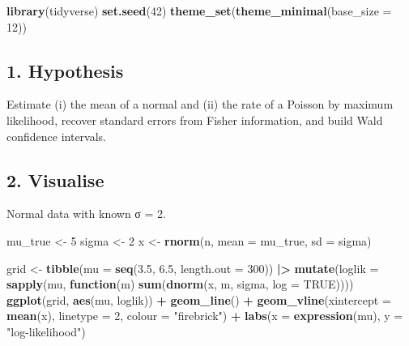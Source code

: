 \documentclass[
]{article}
\newenvironment{Shaded}{\begin{snugshade}}{\end{snugshade}}
\newcommand{\AttributeTok}[1]{\textcolor[rgb]{0.13,0.29,0.53}{#1}}
\newcommand{\ConstantTok}[1]{\textcolor[rgb]{0.56,0.35,0.01}{#1}}
\newcommand{\ControlFlowTok}[1]{\textcolor[rgb]{0.13,0.29,0.53}{\textbf{#1}}}
\newcommand{\DecValTok}[1]{\textcolor[rgb]{0.00,0.00,0.81}{#1}}
\newcommand{\FloatTok}[1]{\textcolor[rgb]{0.00,0.00,0.81}{#1}}
\newcommand{\FunctionTok}[1]{\textcolor[rgb]{0.13,0.29,0.53}{\textbf{#1}}}
\newcommand{\NormalTok}[1]{#1}
\newcommand{\OtherTok}[1]{\textcolor[rgb]{0.56,0.35,0.01}{#1}}
\newcommand{\SpecialCharTok}[1]{\textcolor[rgb]{0.81,0.36,0.00}{\textbf{#1}}}
\newcommand{\StringTok}[1]{\textcolor[rgb]{0.31,0.60,0.02}{#1}}
\begin{document}
\begin{Shaded}
\begin{Highlighting}[]
\FunctionTok{library}\NormalTok{(tidyverse)}
\FunctionTok{set.seed}\NormalTok{(}\DecValTok{42}\NormalTok{)}
\FunctionTok{theme\_set}\NormalTok{(}\FunctionTok{theme\_minimal}\NormalTok{(}\AttributeTok{base\_size =} \DecValTok{12}\NormalTok{))}
\end{Highlighting}
\end{Shaded}

\subsection{1. Hypothesis}\label{hypothesis}

Estimate (i) the mean of a normal and (ii) the rate of a Poisson by
maximum likelihood, recover standard errors from Fisher information, and
build Wald confidence intervals.

\subsection{2. Visualise}\label{visualise}

Normal data with known σ = 2.

\begin{Shaded}
\begin{Highlighting}[]
\NormalTok{mu\_true }\OtherTok{\textless{}{-}} \DecValTok{5}
\NormalTok{sigma }\OtherTok{\textless{}{-}} \DecValTok{2}
\NormalTok{x }\OtherTok{\textless{}{-}} \FunctionTok{rnorm}\NormalTok{(n, }\AttributeTok{mean =}\NormalTok{ mu\_true, }\AttributeTok{sd =}\NormalTok{ sigma)}
\end{Highlighting}
\end{Shaded}

\begin{Shaded}
\begin{Highlighting}[]
\NormalTok{grid }\OtherTok{\textless{}{-}} \FunctionTok{tibble}\NormalTok{(}\AttributeTok{mu =} \FunctionTok{seq}\NormalTok{(}\FloatTok{3.5}\NormalTok{, }\FloatTok{6.5}\NormalTok{, }\AttributeTok{length.out =} \DecValTok{300}\NormalTok{)) }\SpecialCharTok{|\textgreater{}}
  \FunctionTok{mutate}\NormalTok{(}\AttributeTok{loglik =} \FunctionTok{sapply}\NormalTok{(mu, }\ControlFlowTok{function}\NormalTok{(m) }\FunctionTok{sum}\NormalTok{(}\FunctionTok{dnorm}\NormalTok{(x, m, sigma, }\AttributeTok{log =} \ConstantTok{TRUE}\NormalTok{))))}
\FunctionTok{ggplot}\NormalTok{(grid, }\FunctionTok{aes}\NormalTok{(mu, loglik)) }\SpecialCharTok{+}
  \FunctionTok{geom\_line}\NormalTok{() }\SpecialCharTok{+}
  \FunctionTok{geom\_vline}\NormalTok{(}\AttributeTok{xintercept =} \FunctionTok{mean}\NormalTok{(x), }\AttributeTok{linetype =} \DecValTok{2}\NormalTok{, }\AttributeTok{colour =} \StringTok{"firebrick"}\NormalTok{) }\SpecialCharTok{+}
  \FunctionTok{labs}\NormalTok{(}\AttributeTok{x =} \FunctionTok{expression}\NormalTok{(mu), }\AttributeTok{y =} \StringTok{"log{-}likelihood"}\NormalTok{)}
\end{Highlighting}
\end{Shaded}
\end{document}
